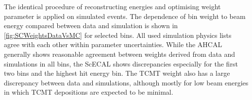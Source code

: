 \documentclass[twoside,a4paper,12pt]{article}
\begin{document}
The identical procedure of reconstructing energies and optimising weight parameter is applied on simulated events. The dependence of bin weight to beam energy compared between data and simulation is shown in \autoref{fig:SCWeightsDataVsMC} for selected bins. All used simulation physics lists agree with each other within parameter uncertainties. While the AHCAL generally shows reasonable agreement between weights derived from data and simulations in all bins, the ScECAL shows discrepancies especially for the first two bins and the highest hit energy bin. The TCMT weight also has a large discrepancy between data and simulations, although mostly for low beam energies in which TCMT depositions are expected to be minimal.


\begin{figure}[htbp]
	\hfill
	\hfill
	

\end{figure}
\end{document}
